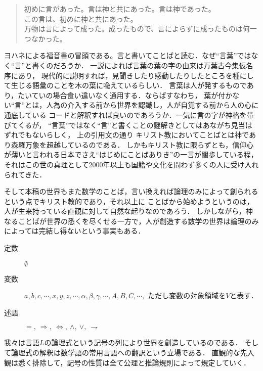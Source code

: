 	\begin{quote}
		初めに言があった。言は神と共にあった。言は神であった。\\
		この言は、初めに神と共にあった。\\
		万物は言によって成った。成ったもので、言によらずに成ったものは何一つなかった。
	\end{quote}
	ヨハネによる福音書の冒頭である。言と書いてことばと読む．なぜ``言葉''ではなく``言''と書くのだろうか．
	一説によれば言葉の葉の字の由来は万葉古今集仮名序にあり，
	現代的に説明すれば，見聞きしたり感動したりしたところを種にして生じる語彙のことを木の葉に喩えているらしい．
	言葉は人が発するものであり，たいていの場合食い違いなく通用する．ならばすなわち，
	葉が付かない``言''とは，人為の介入する前から世界を認識し，人が自覚する前から人の心に通底している
	コードと解釈すれば良いのであろうか．一気に言の字が神格を帯びてくるが，
	``言葉''ではなく``言''と書くことの謎解きとしてはあながち見当はずれでもないらしく，
	上の引用文の通り%
	キリスト教においてことばとは神であり森羅万象を超越しているのである．
	しかもキリスト教に限らずとも，信仰心が薄いと言われる日本でさえ``はじめにことばありき''の一言が闊歩している程，
	それはこの世の真理として2000年以上も国籍や文化を問わず多くの人に受け入れられてきた．
	\begin{comment}
		実際に自然言語の発生が事物の観測なしに起こり得たかという問題は言語哲学上も決着がついていないらしいが，
		少なくとも
	\end{comment}
	そして本稿の世界もまた数学のことば，言い換えれば論理のみによって創られるという点でキリスト教的であり，それ以上に
	ことばから始めようというのは，人が生来持っている直観に対して自然な起りなのであろう．
	しかしながら，神なることばが世界の悉くを尽くせる一方で，人が創造する数学の世界は論理のみによっては完結し得ないという事実もある．
	
	
	\begin{description}
		\item[定数] $\emptyset$
		\item[変数] $a,b,c,\cdots,x,y,z,\cdots,\alpha,\beta,\gamma,\cdots,A,B,C,\cdots,$
			ただし変数の対象領域を$V$と表す．
		\item[述語] $=,\ \Longrightarrow,\ \Longleftrightarrow,
			\ \wedge,\ \vee,\ \rightharpoondown$
	\end{description}
	
	我々は言語$L$の論理式という記号の列により世界を創造しているのである．
	そして論理式の解釈は数学語の常用言語への翻訳という立場である．
	直観的な先入観は悉く排除して，記号の性質は全て公理と推論規則によって規定していく．
	
